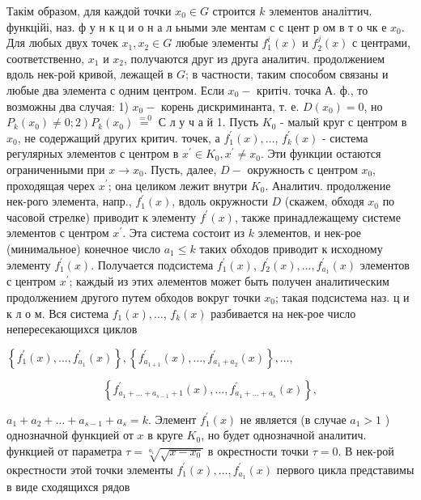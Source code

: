 \documentclass[10pt]{article}
\begin{document}
Такім образом, для каждой точки $x_{0} \in G$ строится $k$ элементов аналіттич. функційі, наз. ф у н к ц и о н а л ьными эле ментам с с цент р ом в т о чк е $x_{0}$. Для любых двух точек $x_{1}, x_{2} \in G$ любые элементы $f_{1}^{i}(x)$ и $f_{2}^{j}(x)$ с центрами, соответственно, $x_{1}$ и $x_{2}$, получаются друг из друга аналитич. продолжением вдоль нек-рой кривой, лежащей в $G$; в частности, таким способом связаны и любые два элемента с одним центром. Если $x_{0}-$ критіч. точка А. ф., то возможны два случая: 1) $x_{0}-$ корень дискриминанта, т. е. $D\left(x_{0}\right)=0$, но $\left.P_{k}\left(x_{0}\right) \neq 0 ; 2\right) P_{k}\left(x_{0}\right) \stackrel{=0}{=}$ С л у ч а й 1. Пусть $K_{0}$ - малый круг с центром в $x_{0}$, не содержащий других критич. точек, а $f_{1}^{\prime}(x), \ldots$, $f_{k}^{\prime}(x)$ - система регулярных элементов с центром в $x^{\prime} \in K_{0}, x^{\prime} \neq x_{0}$. Эти функции остаются ограниченными при $x \rightarrow x_{0}$. Пусть, далее, $D-$ окружность с центром $x_{0}$, проходящая черех $x^{\prime}$; она целиком лежит внутри $K_{0}$. Аналитич. продолжение нек-рого элемента, напр., $f_{1}^{\prime}(x)$, вдоль окружности $D$ (скажем, обходя $x_{0}$ по часовой стрелке) приводит к элементу $f^{\prime}(x)$, также принадлежащему системе элементов с центром $x^{\prime}$. Эта система состоит из $k$ элементов, и нек-рое (минимальное) конечное число $a_{1} \leqslant k$ таких обходов приводит к исходному элементу $f_{1}^{\prime}(x)$. Получается подсистема $f_{1}^{\prime}(x)$, $f_{2}^{\prime}(x), \ldots, f_{a_{1}}^{\prime}(x)$ элементов с центром $x^{\prime}$; каждый из этих әлементов может быть получен аналитическим продолжением другого путем обходов вокруг точки $x_{0}$; такая подсистема наз. ц и к л о м. Вся система $f_{1}(x), \ldots$, $f_{k}(x)$ разбивается на нек-рое число непересекающихся циклов



$\left\{f_{1}^{\prime}(x), \ldots, f_{a_{1}}^{\prime}(x)\right\},\left\{f_{a_{1+1}}^{\prime}(x), \ldots, f_{a_{1}+a_{2}}^{\prime}(x)\right\}, \ldots$,



\[

\left\{f_{a_{1}+\ldots+a_{s-1}+1}^{\prime}(x), \ldots, f_{a_{1}+\ldots+a_{s}}^{\prime}(x)\right\},

\]



$a_{1}+a_{2}+\ldots+a_{s-1}+a_{s}=k$. Элемент $f_{1}^{\prime}(x)$ не является (в случае $a_{1}>1$ ) однозначной функцией от $x$ в круге $K_{0}$, но будет однозначной аналитич. функцией от параметра $\tau=\sqrt[a_{1}]{\sqrt{x-x_{0}}}$ в окрестности точки $\tau=0$. В нек-рой окрестности этой точки элементы $f_{1}^{\prime}(x), \ldots, f_{a_{1}}^{\prime}(x)$ первого цикла представимы в виде сходящихся рядов
\end{document}
